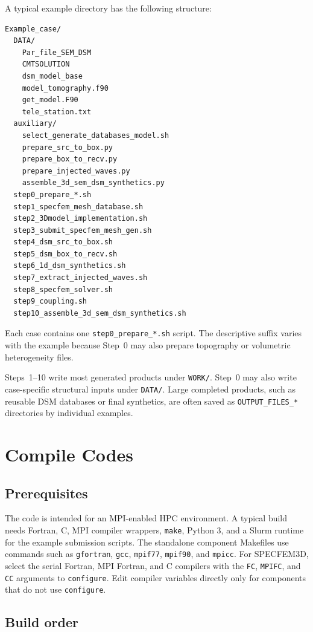 \documentclass[11pt,oneside]{book}
\DeclareRobustCommand{\code}[1]{\nolinkurl{#1}}
\begin{document}
A typical example directory has the following structure:
\begin{lstlisting}
Example_case/
  DATA/
    Par_file_SEM_DSM
    CMTSOLUTION
    dsm_model_base
    model_tomography.f90
    get_model.F90
    tele_station.txt
  auxiliary/
    select_generate_databases_model.sh
    prepare_src_to_box.py
    prepare_box_to_recv.py
    prepare_injected_waves.py
    assemble_3d_sem_dsm_synthetics.py
  step0_prepare_*.sh
  step1_specfem_mesh_database.sh
  step2_3Dmodel_implementation.sh
  step3_submit_specfem_mesh_gen.sh
  step4_dsm_src_to_box.sh
  step5_dsm_box_to_recv.sh
  step6_1d_dsm_synthetics.sh
  step7_extract_injected_waves.sh
  step8_specfem_solver.sh
  step9_coupling.sh
  step10_assemble_3d_sem_dsm_synthetics.sh
\end{lstlisting}

Each case contains one \code{step0_prepare_*.sh} script. The descriptive
suffix varies with the example because Step~0 may also prepare topography or
volumetric heterogeneity files.

Steps~1--10 write most generated products under \code{WORK/}. Step~0 may
also write case-specific structural inputs under \code{DATA/}. Large completed
products, such as reusable DSM databases or final synthetics, are often saved
as \code{OUTPUT_FILES_*} directories by individual examples.

\chapter{Compile Codes}

\section{Prerequisites}

The code is intended for an MPI-enabled HPC environment. A typical build needs
Fortran, C, MPI compiler wrappers, \code{make}, Python 3, and a Slurm runtime
for the example submission scripts. The standalone component Makefiles use
commands such as \code{gfortran}, \code{gcc}, \code{mpif77}, \code{mpif90},
and \code{mpicc}. For SPECFEM3D, select the serial Fortran, MPI Fortran, and C
compilers with the \code{FC}, \code{MPIFC}, and \code{CC} arguments to
\code{configure}. Edit compiler variables directly only for components that do
not use \code{configure}.

\section{Build order}
\end{document}
